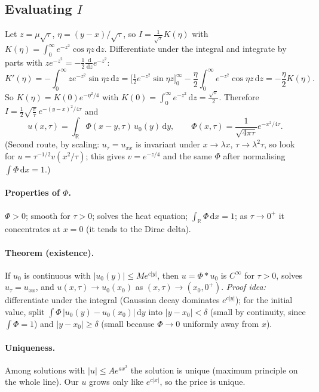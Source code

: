 \documentclass[11pt]{article}
\newcommand{\dd}{\,\mathrm d}
\newcommand{\R}{\mathbb R}
\theoremstyle{definition}
\begin{document}
\subsection{Evaluating $I$}
Let $z=\mu\sqrt\tau$, $\eta=(y-x)/\sqrt\tau$, so $I=\frac{1}{\sqrt\tau}K(\eta)$ with
$K(\eta)=\int_0^\infty e^{-z^2}\cos\eta z\dd z$. Differentiate under the integral and integrate by parts with
$ze^{-z^2}=-\frac12\frac{\dd}{\dd z}e^{-z^2}$:
\[
  K'(\eta)=-\int_0^\infty ze^{-z^2}\sin\eta z\dd z
  =\Big[\tfrac12e^{-z^2}\sin\eta z\Big]_0^\infty-\frac\eta2\int_0^\infty e^{-z^2}\cos\eta z\dd z
  =-\frac\eta2K(\eta).
\]
So $K(\eta)=K(0)e^{-\eta^2/4}$ with $K(0)=\int_0^\infty e^{-z^2}\dd z=\frac{\sqrt\pi}{2}$. Therefore
$I=\frac12\sqrt{\frac{\pi}{\tau}}\,e^{-(y-x)^2/4\tau}$ and
\[
  \boxed{\;u(x,\tau)=\int_\R\Phi(x-y,\tau)\,u_0(y)\dd y,\qquad \Phi(x,\tau)=\frac{1}{\sqrt{4\pi\tau}}e^{-x^2/4\tau}.\;}
\]
(Second route, by scaling: $u_\tau=u_{xx}$ is invariant under $x\to\lambda x$, $\tau\to\lambda^2\tau$, so look
for $u=\tau^{-1/2}v(x^2/\tau)$; this gives $v=e^{-z/4}$ and the same $\Phi$ after normalising
$\int\Phi\dd x=1$.)

\paragraph{Properties of $\Phi$.} $\Phi>0$; smooth for $\tau>0$; solves the heat equation; $\int_\R\Phi\dd x=1$;
as $\tau\to0^+$ it concentrates at $x=0$ (it tends to the Dirac delta).

\paragraph{Theorem (existence).} If $u_0$ is continuous with $|u_0(y)|\le Me^{c|y|}$, then $u=\Phi*u_0$ is
$C^\infty$ for $\tau>0$, solves $u_\tau=u_{xx}$, and $u(x,\tau)\to u_0(x_0)$ as $(x,\tau)\to(x_0,0^+)$.
\emph{Proof idea:} differentiate under the integral (Gaussian decay dominates $e^{c|y|}$); for the initial
value, split $\int\Phi\,|u_0(y)-u_0(x_0)|\dd y$ into $|y-x_0|<\delta$ (small by continuity, since $\int\Phi=1$)
and $|y-x_0|\ge\delta$ (small because $\Phi\to0$ uniformly away from $x$).

\paragraph{Uniqueness.} Among solutions with $|u|\le Ae^{ax^2}$ the solution is unique (maximum principle on
the whole line). Our $u$ grows only like $e^{c|x|}$, so the price is unique.
\end{document}
